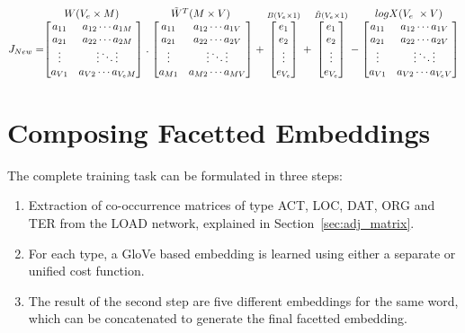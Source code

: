 \[J_{New } =\stackrel{\mbox{$W( V_{e}\times M)$ }}{%
    \begin{bmatrix}
    a_{11} & a_{12}  \cdots  a_{1M} \\
    a_{21} & a_{22}  \cdots  a_{2M} \\
    \vdots & \vdots  \ddots  \vdots \\
    a_{V1} & a_{V2}  \cdots  a_{V
_{e}M}
    \end{bmatrix}%
  } .
  \stackrel{\mbox{$\tilde{W}^T(M \times V)$ }}{%
    \begin{bmatrix}
    a_{11} & a_{12}  \cdots  a_{1V} \\
    a_{21} & a_{22} \cdots  a_{2V} \\
    \vdots & \vdots \ddots \vdots \\
    a_{M1} & a_{M2}  \cdots  a_{MV}
    \end{bmatrix}%
  } +
  \stackrel{B( V_{e}\times 1)}{%
    \begin{bmatrix}
    e_1 \\
    e_2 \\
    \vdots \\
    e_{V_{e}}
    \end{bmatrix}%
   }
   +
  \stackrel{\tilde{B}(V_{e}\times 1)}{%
    \begin{bmatrix}
    e_1 \\
    e_2 \\
    \vdots \\
    e_{V_{e}}
    \end{bmatrix}%
   }-
   \stackrel{\mbox{$logX( V_{e}\ \times V)$ }}{%
    \begin{bmatrix}
    a_{11} & a_{12}  \cdots  a_{1V} \\
    a_{21} & a_{22}  \cdots  a_{2V} \\
    \vdots & \vdots  \ddots  \vdots \\
    a_{V1} & a_{V2}  \cdots  a_{V_{e}V}
    \end{bmatrix}%
  }
\]

\section{Composing Facetted Embeddings }
The complete training task can be formulated in three steps: 
 \begin{enumerate}        
 \item Extraction of co-occurrence matrices of type ACT, LOC, DAT, ORG and TER from the LOAD network, explained in Section~\ref{sec:adj_matrix}. 
 \item For each type, a GloVe based embedding is learned using either a separate or unified cost function. 
 \item The result of the second step are five different embeddings for the same word, which can be concatenated to generate the final facetted embedding. 
 \end{enumerate}

